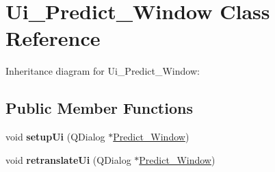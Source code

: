 \hypertarget{class_ui___predict___window}{}\section{Ui\+\_\+\+Predict\+\_\+\+Window Class Reference}
\label{class_ui___predict___window}


Inheritance diagram for Ui\+\_\+\+Predict\+\_\+\+Window\+:
\subsection*{Public Member Functions}
\begin{DoxyCompactItemize}
\item 
\mbox{\label{class_ui___predict___window_aa52ec812ebae4838eb4ddde770d11eaa}} 
void {\bfseries setup\+Ui} (Q\+Dialog $\ast$\hyperlink{class_predict___window}{Predict\+\_\+\+Window})
\item 
\mbox{\label{class_ui___predict___window_a9c8556dd6368894bdf9314f9f4878fd6}} 
void {\bfseries retranslate\+Ui} (Q\+Dialog $\ast$\hyperlink{class_predict___window}{Predict\+\_\+\+Window})
\end{DoxyCompactItemize}
